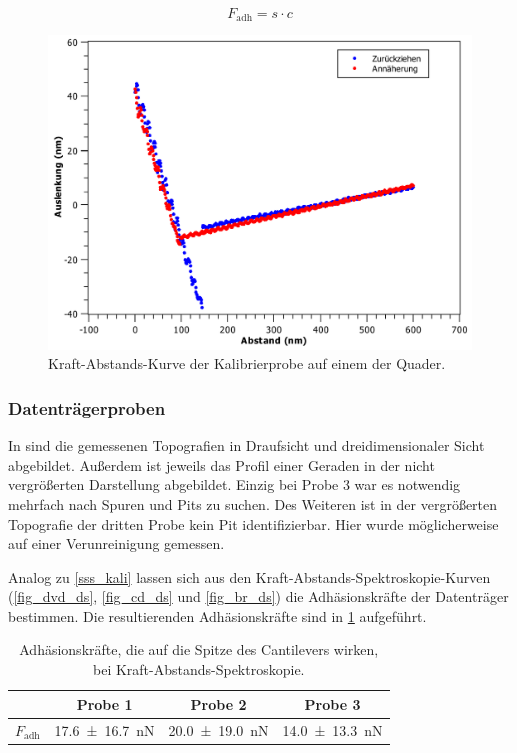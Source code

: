 \documentclass[
	a4paper,
	12pt,
	pagesize,
	ngerman
]{scrartcl}
\begin{document}
\begin{equation}
			\label{eq_adh}
			F_\text{adh} = s \cdot c
	\end{equation}

\begin {figure}[H]
\includegraphics[width=.7\linewidth]{images/Kali/DS1}
\caption{Kraft-Abstands-Kurve der Kalibrierprobe auf einem der Quader.}
\label{fig_kali_expl}
\end{figure}

\subsubsection{Datenträgerproben}
In  sind die gemessenen Topografien in Draufsicht und dreidimensionaler Sicht abgebildet.
Außerdem ist jeweils das Profil einer Geraden in der nicht vergrößerten Darstellung abgebildet.
Einzig bei Probe 3 war es notwendig mehrfach nach Spuren und Pits zu suchen.
Des Weiteren ist in der vergrößerten Topografie der dritten Probe kein Pit identifizierbar. %
Hier wurde möglicherweise auf einer Verunreinigung gemessen. %

Analog zu \cref{sss_kali} lassen sich aus den Kraft-Abstands-Spektroskopie-Kurven (\cref{fig_dvd_ds}, \cref{fig_cd_ds} und \cref{fig_br_ds}) die Adhäsionskräfte der Datenträger bestimmen.
	Die resultierenden Adhäsionskräfte sind in \cref{tb_adh} aufgeführt.

\begin{table}[H]
		\centering
		\begin{tabular}{ c | c | c | c }
			 & Probe 1 & Probe 2 & Probe 3\\ \hline
			$F_\text{adh}$ & \SI{17.6+-16.7}{nN} & \SI{20.0+-19.0}{nN} &\SI{14.0+-13.3}{nN} \\
		\end{tabular}
		\caption{Adhäsionskräfte, die auf die Spitze des Cantilevers wirken, bei Kraft-Abstands-Spektroskopie.}
		\label{tb_adh}
\end{table}
\end{document}
